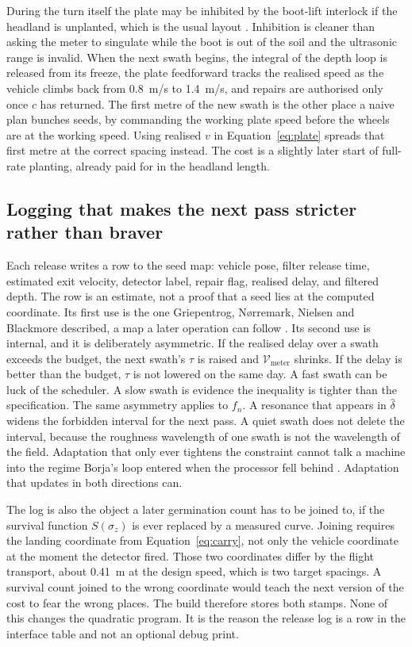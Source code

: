 During the turn itself the plate may be inhibited by the boot-lift interlock if the headland is unplanted, which is the usual layout \cite{bochtis2008}. Inhibition is cleaner than asking the meter to singulate while the boot is out of the soil and the ultrasonic range is invalid. When the next swath begins, the integral of the depth loop is released from its freeze, the plate feedforward tracks the realised speed as the vehicle climbs back from \SI{0.8}{m/s} to \SI{1.4}{m/s}, and repairs are authorised only once \(c\) has returned. The first metre of the new swath is the other place a naive plan bunches seeds, by commanding the working plate speed before the wheels are at the working speed. Using realised \(v\) in Equation~\eqref{eq:plate} spreads that first metre at the correct spacing instead. The cost is a slightly later start of full-rate planting, already paid for in the headland length.

\subsection{Logging that makes the next pass stricter rather than braver}

Each release writes a row to the seed map: vehicle pose, filter release time, estimated exit velocity, detector label, repair flag, realised delay, and filtered depth. The row is an estimate, not a proof that a seed lies at the computed coordinate. Its first use is the one Griepentrog, N{\o}rremark, Nielsen and Blackmore described, a map a later operation can follow \cite{griepentrog2005}. Its second use is internal, and it is deliberately asymmetric. If the realised delay over a swath exceeds the budget, the next swath's \(\tau\) is raised and \(\mathcal{V}_{\mathrm{meter}}\) shrinks. If the delay is better than the budget, \(\tau\) is not lowered on the same day. A fast swath can be luck of the scheduler. A slow swath is evidence the inequality is tighter than the specification. The same asymmetry applies to \(f_n\). A resonance that appears in \(\hat{\delta}\) widens the forbidden interval for the next pass. A quiet swath does not delete the interval, because the roughness wavelength of one swath is not the wavelength of the field. Adaptation that only ever tightens the constraint cannot talk a machine into the regime Borja's loop entered when the processor fell behind \cite{borja2021}. Adaptation that updates in both directions can.

The log is also the object a later germination count has to be joined to, if the survival function \(S(\sigma_z)\) is ever replaced by a measured curve. Joining requires the landing coordinate from Equation~\eqref{eq:carry}, not only the vehicle coordinate at the moment the detector fired. Those two coordinates differ by the flight transport, about \SI{0.41}{m} at the design speed, which is two target spacings. A survival count joined to the wrong coordinate would teach the next version of the cost to fear the wrong places. The build therefore stores both stamps. None of this changes the quadratic program. It is the reason the release log is a row in the interface table and not an optional debug print.

